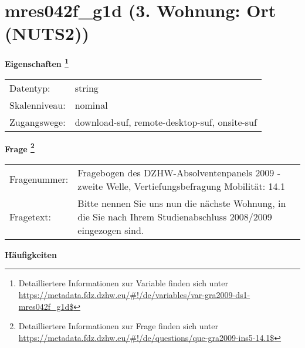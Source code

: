 
    \setcounter{footnote}{0}

    \vspace*{-1.8cm}
	\section{mres042f\_g1d (3. Wohnung: Ort (NUTS2))}
	\label{section:mres042f_g1d}



    \vspace*{0.5cm}
    \noindent\textbf{Eigenschaften
	\footnote{Detailliertere Informationen zur Variable finden sich unter
		\url{https://metadata.fdz.dzhw.eu/\#!/de/variables/var-gra2009-ds1-mres042f_g1d$}}}\\
	\begin{tabularx}{\hsize}{@{}lX}
	Datentyp: & string \\
	Skalenniveau: & nominal \\
	Zugangswege: &
	  download-suf, 
	  remote-desktop-suf, 
	  onsite-suf
 \\
    \end{tabularx}



				\vspace*{0.5cm}
                \noindent\textbf{Frage
	                \footnote{Detailliertere Informationen zur Frage finden sich unter
		              \url{https://metadata.fdz.dzhw.eu/\#!/de/questions/que-gra2009-ins5-14.1$}}}\\
				\begin{tabularx}{\hsize}{@{}lX}
					Fragenummer: &
					  Fragebogen des DZHW-Absolventenpanels 2009 - zweite Welle, Vertiefungsbefragung Mobilität:
					  14.1
 \\
					Fragetext: & Bitte nennen Sie uns nun die nächste Wohnung, in die Sie nach Ihrem Studienabschluss 2008/2009 eingezogen sind. \\
				\end{tabularx}





        		\vspace*{0.5cm}
                \noindent\textbf{Häufigkeiten}

